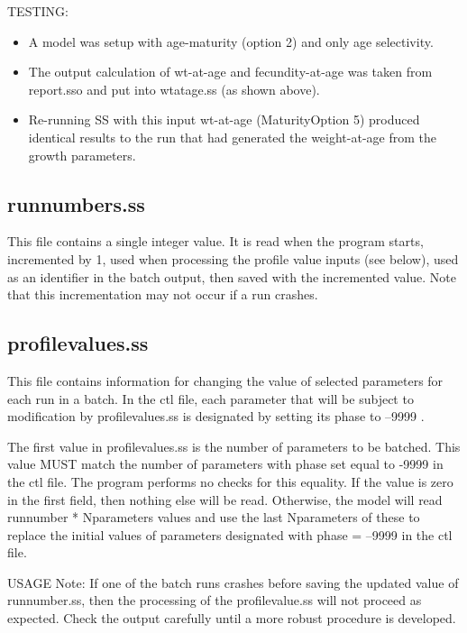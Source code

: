 TESTING:
\begin{itemize}
	\item A model was setup with age-maturity (option 2) and only age selectivity.
	\item The output calculation of wt-at-age and fecundity-at-age was taken from report.sso and put into wtatage.ss (as shown above).
	\item Re-running SS with this input wt-at-age (Maturity\textunderscore Option 5) produced identical results to the run that had generated the weight-at-age from the growth parameters.
\end{itemize}

\subsection{runnumbers.ss}
This file contains a single integer value.  It is read when the program starts, incremented by 1, used when processing the profile value inputs (see below), used as an identifier in the batch output, then saved with the incremented value.  Note that this incrementation may not occur if a run crashes.

\subsection{profilevalues.ss}	
This file contains information for changing the value of selected parameters for each run in a batch.  In the ctl file, each parameter that will be subject to modification by profilevalues.ss is designated by setting its phase to --9999 .

The first value in profilevalues.ss is the number of parameters to be batched.  This value MUST match the number of parameters with phase set equal to -9999 in the ctl file.  The program performs no checks for this equality.  If the value is zero in the first field, then nothing else will be read.  Otherwise, the model will read runnumber * Nparameters values and use the last Nparameters of these to replace the initial values of parameters designated with phase = --9999 in the ctl file.

USAGE Note:  
If one of the batch runs crashes before saving the updated value of runnumber.ss, then the processing of the profilevalue.ss will not proceed as expected.  Check the output carefully until a more robust procedure is developed.


